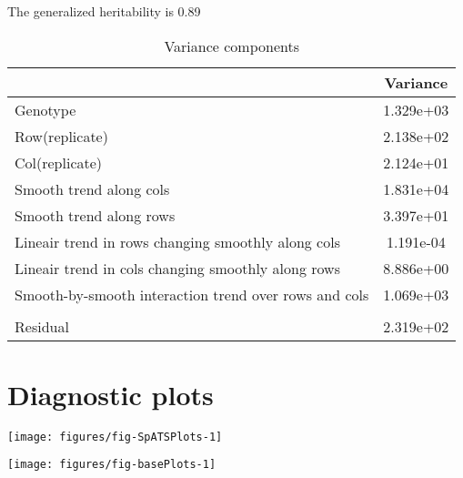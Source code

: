 \documentclass[a4paper,11pt]{article}\usepackage[]{graphicx}\usepackage[]{color}
\makeatletter
\def\maxwidth{ %
  \ifdim\Gin@nat@width>\linewidth
    \linewidth
  \else
    \Gin@nat@width
  \fi
}
\newenvironment{knitrout}{}{} %
\makeatother
\begin{document}
\newpage
The generalized heritability is 0.89%
\begin{table}[ht]
\begin{flushleft}
\caption{Variance components} 
\label{varComps}
\begin{tabular}{lc}
  \hline
 & Variance \\ 
  \hline
Genotype & 1.329e+03 \\ 
  Row(replicate) & 2.138e+02 \\ 
  Col(replicate) & 2.124e+01 \\ 
  Smooth trend along cols & 1.831e+04 \\ 
  Smooth trend along rows & 3.397e+01 \\ 
  Lineair trend in rows changing smoothly along cols & 1.191e-04 \\ 
  Lineair trend in cols changing smoothly along rows & 8.886e+00 \\ 
  Smooth-by-smooth interaction trend over rows and cols & 1.069e+03 \\ 
   &  \\ 
  Residual & 2.319e+02 \\ 
   \hline
\end{tabular}
\end{flushleft}
\end{table}

\clearpage

\section{Diagnostic plots}
\begin{knitrout}
\color{fgcolor}

{\centering \texttt{[image: figures/fig-SpATSPlots-1]} 

}



\end{knitrout}

\begin{knitrout}
\color{fgcolor}

{\centering \texttt{[image: figures/fig-basePlots-1]} 

}



\end{knitrout}
\newpage
\end{document}

